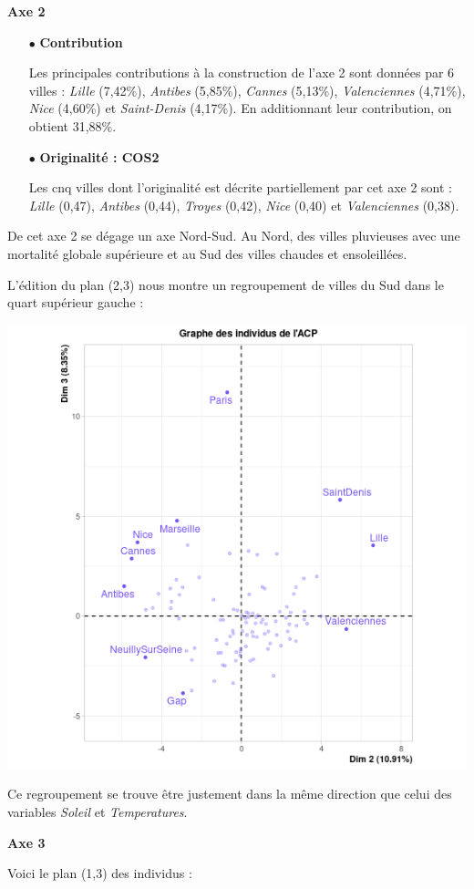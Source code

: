 \documentclass{article}
\begin{document}
\bigskip

{\large \textbf{Axe 2}}

\begin{itemize}
\item[$\bullet$] \textbf{Contribution}

Les principales contributions à la construction de l'axe 2 sont données par 6 villes : \emph{Lille} (7,42\%), \emph{Antibes} (5,85\%), \emph{Cannes} (5,13\%), \emph{Valenciennes} (4,71\%), \emph{Nice} (4,60\%) et \emph{Saint-Denis} (4,17\%). En additionnant leur contribution, on obtient 31,88\%. 

\item[$\bullet$] \textbf{Originalité : COS2}

Les cnq villes dont l'originalité est décrite partiellement par cet axe 2 sont : \emph{Lille} (0,47), \emph{Antibes} (0,44), \emph{Troyes} (0,42), \emph{Nice} (0,40) et \emph{Valenciennes} (0,38).
\end{itemize}

De cet axe 2 se dégage un axe Nord-Sud. Au Nord, des villes pluvieuses avec une mortalité globale supérieure et au Sud des villes chaudes et ensoleillées.

L'édition du plan (2,3) nous montre un regroupement de villes du Sud dans le quart supérieur gauche :

\centerline{\includegraphics[width=0.5\linewidth]{images/ACP_ind_23_contrib}} 

Ce regroupement se trouve être justement dans la même direction que celui des variables \emph{Soleil} et \emph{Temperatures}.

\newpage

{\large \textbf{Axe 3}}

Voici le plan (1,3) des individus : 
\end{document}
